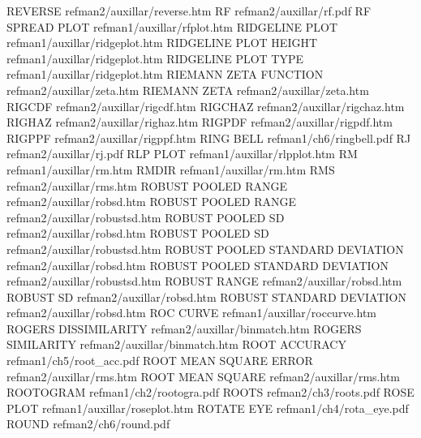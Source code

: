 REVERSE                                 refman2/auxillar/reverse.htm
RF                                      refman2/auxillar/rf.pdf
RF SPREAD PLOT                          refman1/auxillar/rfplot.htm
RIDGELINE PLOT                          refman1/auxillar/ridgeplot.htm
RIDGELINE PLOT HEIGHT                   refman1/auxillar/ridgeplot.htm
RIDGELINE PLOT TYPE                     refman1/auxillar/ridgeplot.htm
RIEMANN ZETA FUNCTION                   refman2/auxillar/zeta.htm
RIEMANN ZETA                            refman2/auxillar/zeta.htm
RIGCDF                                  refman2/auxillar/rigcdf.htm
RIGCHAZ                                 refman2/auxillar/rigchaz.htm
RIGHAZ                                  refman2/auxillar/righaz.htm
RIGPDF                                  refman2/auxillar/rigpdf.htm
RIGPPF                                  refman2/auxillar/rigppf.htm
RING BELL                               refman1/ch6/ringbell.pdf
RJ                                      refman2/auxillar/rj.pdf
RLP PLOT                                refman1/auxillar/rlpplot.htm
RM                                      refman1/auxillar/rm.htm
RMDIR                                   refman1/auxillar/rm.htm
RMS                                     refman2/auxillar/rms.htm
ROBUST POOLED RANGE                     refman2/auxillar/robsd.htm
ROBUST POOLED RANGE                     refman2/auxillar/robustsd.htm
ROBUST POOLED SD                        refman2/auxillar/robsd.htm
ROBUST POOLED SD                        refman2/auxillar/robustsd.htm
ROBUST POOLED STANDARD DEVIATION        refman2/auxillar/robsd.htm
ROBUST POOLED STANDARD DEVIATION        refman2/auxillar/robustsd.htm
ROBUST RANGE                            refman2/auxillar/robsd.htm
ROBUST SD                               refman2/auxillar/robsd.htm
ROBUST STANDARD DEVIATION               refman2/auxillar/robsd.htm
ROC CURVE                               refman1/auxillar/roccurve.htm
ROGERS DISSIMILARITY                    refman2/auxillar/binmatch.htm
ROGERS SIMILARITY                       refman2/auxillar/binmatch.htm
ROOT ACCURACY                           refman1/ch5/root_acc.pdf
ROOT MEAN SQUARE ERROR                  refman2/auxillar/rms.htm
ROOT MEAN SQUARE                        refman2/auxillar/rms.htm
ROOTOGRAM                               refman1/ch2/rootogra.pdf
ROOTS                                   refman2/ch3/roots.pdf
ROSE PLOT                               refman1/auxillar/roseplot.htm
ROTATE EYE                              refman1/ch4/rota_eye.pdf
ROUND                                   refman2/ch6/round.pdf
